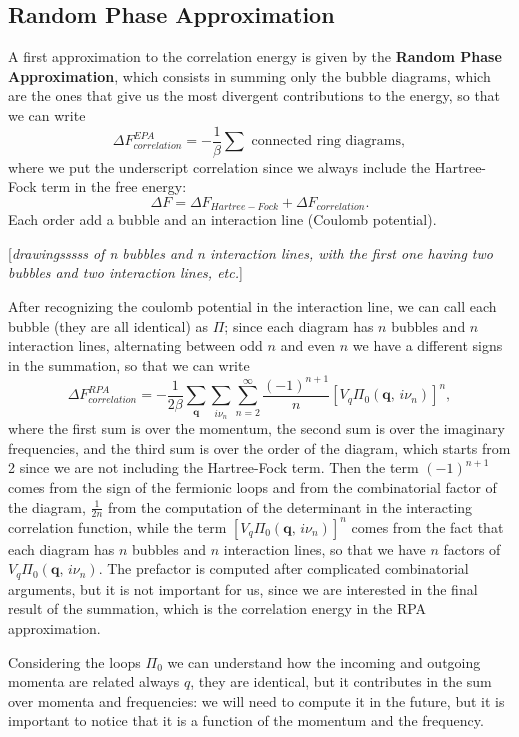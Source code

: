 \subsection{Random Phase Approximation}

A first approximation to the correlation energy is given by the \textbf{Random Phase Approximation}, which consists in summing only the bubble diagrams, which are the ones that give us the most divergent contributions to the energy, so that we can write
\[
    \Delta F^{EPA}_{correlation} = - \frac{1}{\beta} \sum \text{ connected ring diagrams},
\]
where we put the underscript correlation since we always include the Hartree-Fock term in the free energy:
\[
    \Delta F = \Delta F_{Hartree-Fock} + \Delta F_{correlation}.
\]
Each order add a bubble and an interaction line (Coulomb potential).

    [\textit{drawingsssss of n bubbles and n interaction lines, with the first one having two bubbles and two interaction lines, etc.}]

After recognizing the coulomb potential in the interaction line, we can call each bubble (they are all identical) as \(\Pi\); since each diagram has \(n\) bubbles and \(n\) interaction lines, alternating between odd \(n\) and even \(n\) we have a different signs in the summation, so that we can write
\[
    \Delta F^{RPA}_{correlation} = - \frac{1}{2\beta} \sum_{\mathbf{q}} \sum_{i \nu_n} \sum_{n=2}^{\infty} \frac{(-1)^{n+1}}{n} \left[ V_q \Pi_0(\mathbf{q},\, i \nu_n) \right]^n,
\]
where the first sum is over the momentum, the second sum is over the imaginary frequencies, and the third sum is over the order of the diagram, which starts from 2 since we are not including the Hartree-Fock term. Then the term \((-1)^{n+1}\) comes from the sign of the fermionic loops and from the combinatorial factor of the diagram, \(\frac{1}{2n}\) from the computation of the determinant in the interacting correlation function, while the term \(\left[ V_q \Pi_0(\mathbf{q},\, i \nu_n) \right]^n\) comes from the fact that each diagram has \(n\) bubbles and \(n\) interaction lines, so that we have \(n\) factors of \(V_q \Pi_0(\mathbf{q},\, i \nu_n)\). The prefactor is computed after complicated combinatorial arguments, but it is not important for us, since we are interested in the final result of the summation, which is the correlation energy in the RPA approximation.

Considering the loops \(\Pi_0\) we can understand how the incoming and outgoing momenta are related always \(q\), they are identical, but it contributes in the sum over momenta and frequencies: we will need to compute it in the future, but it is important to notice that it is a function of the momentum and the frequency.

